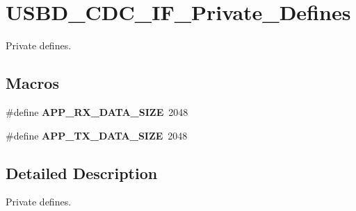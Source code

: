 \hypertarget{group__USBD__CDC__IF__Private__Defines}{}\section{U\+S\+B\+D\+\_\+\+C\+D\+C\+\_\+\+I\+F\+\_\+\+Private\+\_\+\+Defines}
\label{group__USBD__CDC__IF__Private__Defines}


Private defines.  


\subsection*{Macros}
\begin{DoxyCompactItemize}
\item 
\mbox{\label{group__USBD__CDC__IF__Private__Defines_gaf3db03a3d03a80e1ec7a0a9c470d9692}} 
\#define {\bfseries A\+P\+P\+\_\+\+R\+X\+\_\+\+D\+A\+T\+A\+\_\+\+S\+I\+ZE}~2048
\item 
\mbox{\label{group__USBD__CDC__IF__Private__Defines_gaff35924b436331d533599db9489c79ee}} 
\#define {\bfseries A\+P\+P\+\_\+\+T\+X\+\_\+\+D\+A\+T\+A\+\_\+\+S\+I\+ZE}~2048
\end{DoxyCompactItemize}


\subsection{Detailed Description}
Private defines. 

